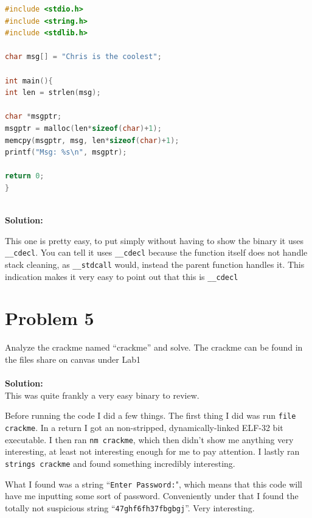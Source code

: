 \documentclass[12pt]{article}
\newcommand\tab[1][0.5cm]{\hspace*{#1}}
\begin{document}
\begin{lstlisting}[language=C]
#include <stdio.h>
#include <string.h>
#include <stdlib.h>

char msg[] = "Chris is the coolest";

int main(){
int len = strlen(msg);

char *msgptr;
msgptr = malloc(len*sizeof(char)+1);
memcpy(msgptr, msg, len*sizeof(char)+1);
printf("Msg: %s\n", msgptr);

return 0;
}
\end{lstlisting}
\textbf{\\Solution:\\} 

This one is pretty easy, to put simply without having to show the binary it uses \texttt{\_\_cdecl}. You can tell it uses \texttt{\_\_cdecl}
because the function itself does not handle stack cleaning, as \texttt{\_\_stdcall} would, instead the parent function handles it. This 
indication makes it very easy to point out that this is \texttt{\_\_cdecl}


\newpage

\section{Problem 5}
\tab Analyze the crackme named “crackme” and solve. The crackme can be found in the files share
on canvas under Lab1
\\ \\
\textbf{Solution:} \\ 

This was quite frankly a very easy binary to review.

Before running the code I did a few things. The first thing I did was run \texttt{file crackme}. In a return I got an non-stripped,
dynamically-linked ELF-32 bit executable. I then ran \texttt{nm crackme}, which then didn't show me anything very interesting, at least not
interesting enough for me to pay attention. I lastly ran \texttt{strings crackme} and found something incredibly interesting.

What I found was a string ``\texttt{Enter Password:}", which means that this code will have me inputting some sort of password. 
Conveniently under that I found the totally not suspicious string ``\texttt{47ghf6fh37fbgbgj}''. Very interesting. 
\end{document}
